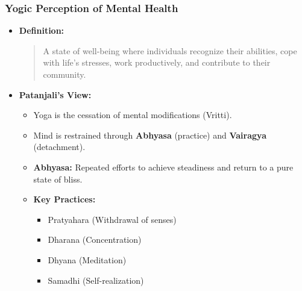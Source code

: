 \begin{frame}[fragile]\frametitle{Yogic Perception of Mental Health}

      \begin{itemize}
        \item \textbf{Definition:}
        \begin{quote}
        A state of well-being where individuals recognize their abilities, cope with life's stresses, work productively, and contribute to their community.
        \end{quote}
        \item \textbf{Patanjali's View:}
        \begin{itemize}
            \item Yoga is the cessation of mental modifications (Vritti).
            \item Mind is restrained through \textbf{Abhyasa} (practice) and \textbf{Vairagya} (detachment).
            \item \textbf{Abhyasa:} Repeated efforts to achieve steadiness and return to a pure state of bliss.
            \item \textbf{Key Practices:} 
                \begin{itemize}
                    \item Pratyahara (Withdrawal of senses)
                    \item Dharana (Concentration)
                    \item Dhyana (Meditation)
                    \item Samadhi (Self-realization)
                \end{itemize}
        \end{itemize}
      \end{itemize}

\end{frame}

